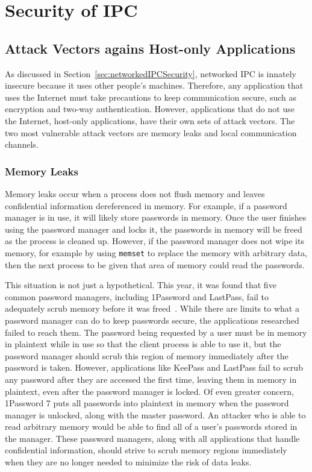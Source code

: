\chapter{Security of IPC}
\label{sec:securityOfIPC}

\section{Attack Vectors agains Host-only Applications}
\label{sec:hostOnlyAttackVectors}
As discussed in Section~\ref{sec:networkedIPCSecurity}, networked IPC is innately insecure because it uses other people's machines.  Therefore, any application that uses the Internet must take precautions to keep communication secure, such as encryption and two-way authentication.  However, applications that do not use the Internet, host-only applications, have their own sets of attack vectors.  The two most vulnerable attack vectors are memory leaks and local communication channels.

\subsection{Memory Leaks}
\label{sec:memoryLeaks}
Memory leaks occur when a process does not flush memory and leaves confidential information dereferenced in memory.  For example, if a password manager is in use, it will likely store passwords in memory.  Once the user finishes using the password manager and locks it, the passwords in memory will be freed as the process is cleaned up.  However, if the password manager does not wipe its memory, for example by using \texttt{memset} to replace the memory with arbitrary data, then the next process to be given that area of memory could read the passwords.

This situation is not just a hypothetical.  This year, it was found that five common password managers, including 1Password and LastPass, fail to adequately scrub memory before it was freed~\cite{independent_security_evaluators_2019}.  While there are limits to what a password manager can do to keep passwords secure, the applications researched failed to reach them.  The password being requested by a user must be in memory in plaintext while in use so that the client process is able to use it, but the password manager should scrub this region of memory immediately after the password is taken.  However, applications like KeePass and LastPass fail to scrub any password after they are accessed the first time, leaving them in memory in plaintext, even after the password manager is locked.  Of even greater concern, 1Password 7 puts all passwords into plaintext in memory when the password manager is unlocked, along with the master password.  An attacker who is able to read arbitrary memory would be able to find all of a user's passwords stored in the manager.  These password managers, along with all applications that handle confidential information, should strive to scrub memory regions immediately when they are no longer needed to minimize the risk of data leaks.

